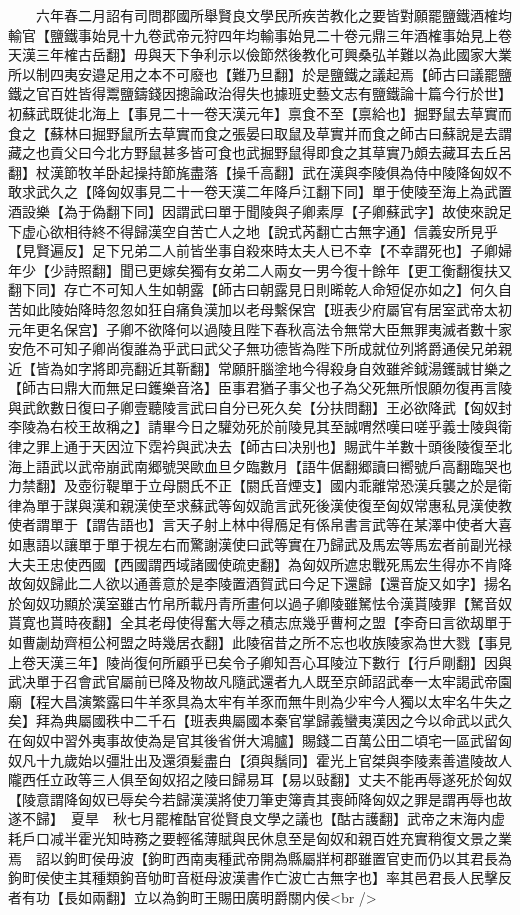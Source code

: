 　　六年春二月詔有司問郡國所舉賢良文學民所疾苦教化之要皆對願罷鹽鐵酒榷均輸官【鹽鐵事始見十九卷武帝元狩四年均輸事始見二十卷元鼎三年酒榷事始見上卷天漢三年榷古岳翻】毋與天下争利示以儉節然後教化可興桑弘羊難以為此國家大業所以制四夷安邉足用之本不可廢也【難乃旦翻】於是鹽鐵之議起焉【師古曰議罷鹽鐵之官百姓皆得鬻鹽鑄錢因摠論政治得失也據班史藝文志有鹽鐵論十篇今行於世】初蘇武既徙北海上【事見二十一卷天漢元年】禀食不至【禀給也】掘野鼠去草實而食之【蘇林曰掘野鼠所去草實而食之張晏曰取鼠及草實并而食之師古曰蘇說是去謂藏之也貢父曰今北方野鼠甚多皆可食也武掘野鼠得即食之其草實乃頗去藏耳去丘呂翻】杖漢節牧羊卧起操持節旄盡落【操千高翻】武在漢與李陵俱為侍中陵降匈奴不敢求武久之【降匈奴事見二十一卷天漢二年降戶江翻下同】單于使陵至海上為武置酒設樂【為于偽翻下同】因謂武曰單于聞陵與子卿素厚【子卿蘇武字】故使來說足下虚心欲相待終不得歸漢空自苦亡人之地【說式芮翻亡古無字通】信義安所見乎【見賢遍反】足下兄弟二人前皆坐事自殺來時太夫人已不幸【不幸謂死也】子卿婦年少【少詩照翻】聞已更嫁矣獨有女弟二人兩女一男今復十餘年【更工衡翻復扶又翻下同】存亡不可知人生如朝露【師古曰朝露見日則晞乾人命短促亦如之】何久自苦如此陵始降時忽忽如狂自痛負漢加以老母繫保宫【班表少府屬官有居室武帝太初元年更名保宫】子卿不欲降何以過陵且陛下春秋高法令無常大臣無罪夷滅者數十家安危不可知子卿尚復誰為乎武曰武父子無功德皆為陛下所成就位列將爵通侯兄弟親近【皆為如字將即亮翻近其靳翻】常願肝腦塗地今得殺身自效雖斧鉞湯鑊誠甘樂之【師古曰鼎大而無足曰鑊樂音洛】臣事君猶子事父也子為父死無所恨願勿復再言陵與武飲數日復曰子卿壹聽陵言武曰自分已死久矣【分扶問翻】王必欲降武【匈奴封李陵為右校王故稱之】請畢今日之驩効死於前陵見其至誠喟然嘆曰嗟乎義士陵與衛律之罪上通于天因泣下霑衿與武决去【師古曰决别也】賜武牛羊數十頭後陵復至北海上語武以武帝崩武南郷號哭歐血旦夕臨數月【語牛倨翻郷讀曰嚮號戶高翻臨哭也力禁翻】及壺衍鞮單于立母閼氏不正【閼氏音煙支】國内乖離常恐漢兵襲之於是衛律為單于謀與漢和親漢使至求蘇武等匈奴詭言武死後漢使復至匈奴常惠私見漢使教使者謂單于【謂告語也】言天子射上林中得鴈足有係帛書言武等在某澤中使者大喜如惠語以讓單于單于視左右而驚謝漢使曰武等實在乃歸武及馬宏等馬宏者前副光禄大夫王忠使西國【西國謂西域諸國使疏吏翻】為匈奴所遮忠戰死馬宏生得亦不肯降故匈奴歸此二人欲以通善意於是李陵置酒賀武曰今足下還歸【還音旋又如字】揚名於匈奴功顯於漢室雖古竹帛所載丹青所畫何以過子卿陵雖駑怯令漢貰陵罪【駑音奴貰寛也貰時夜翻】全其老母使得奮大辱之積志庶幾乎曹柯之盟【李奇曰言欲刼單于如曹劌劫齊桓公柯盟之時幾居衣翻】此陵宿昔之所不忘也收族陵家為世大戮【事見上卷天漢三年】陵尚復何所顧乎已矣令子卿知吾心耳陵泣下數行【行戶剛翻】因與武决單于召會武官屬前已降及物故凡隨武還者九人既至京師詔武奉一太牢謁武帝園廟【程大昌演繁露曰牛羊豕具為太牢有羊豕而無牛則為少牢今人獨以太牢名牛失之矣】拜為典屬國秩中二千石【班表典屬國本秦官掌歸義蠻夷漢因之今以命武以武久在匈奴中習外夷事故使為是官其後省併大鴻臚】賜錢二百萬公田二頃宅一區武留匈奴凡十九歲始以彊壯出及還須髪盡白【須與鬚同】霍光上官桀與李陵素善遣陵故人隴西任立政等三人俱至匈奴招之陵曰歸易耳【易以䜴翻】丈夫不能再辱遂死於匈奴【陵意謂降匈奴已辱矣今若歸漢漢將使刀筆吏簿責其喪師降匈奴之罪是謂再辱也故遂不歸】　夏旱　秋七月罷榷酤官從賢良文學之議也【酤古護翻】武帝之末海内虚耗戶口减半霍光知時務之要輕徭薄賦與民休息至是匈奴和親百姓充實稍復文景之業焉　詔以鉤町侯毋波【鉤町西南夷種武帝開為縣屬牂柯郡雖置官吏而仍以其君長為鉤町侯使主其種類鉤音劬町音梃母波漢書作亡波亡古無字也】率其邑君長人民擊反者有功【長如兩翻】立以為鉤町王賜田廣明爵關内侯<br />
